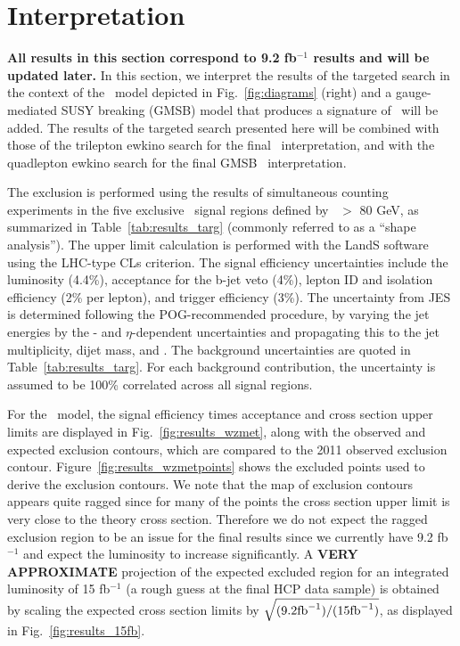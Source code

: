 \section{Interpretation}
\label{sec:interpretation}

{\bf All results in this section correspond to 9.2 fb$^{-1}$ results and will be updated later.}
In this section, we interpret the results of the targeted search in the context of the \wzmet\ model depicted in Fig.~\ref{fig:diagrams} (right)
and a gauge-mediated SUSY breaking (GMSB) model that produces a signature of \zzmet\ will be added. The results of the targeted search presented here
will be combined with those of the trilepton ewkino search for the final \wzmet\ interpretation, and with the quadlepton ewkino search
for the final GMSB \zzmet\ interpretation.

The exclusion is performed using the results of simultaneous counting experiments in the five exclusive \MET\ signal regions defined by \MET\ $>$ 80 GeV,
as summarized in Table~\ref{tab:results_targ} (commonly referred to as a ``shape analysis''). 
The upper limit calculation is performed with the LandS software using the LHC-type CLs criterion.
The signal efficiency uncertainties include the luminosity (4.4\%), acceptance for the b-jet veto (4\%), lepton ID and isolation efficiency (2\% per lepton),
and trigger efficiency (3\%). The uncertainty from JES is determined following the POG-recommended procedure, by varying the jet energies by the 
\pt- and $\eta$-dependent uncertainties and propagating this to the jet multiplicity, dijet mass, and \MET.
The background uncertainties are quoted in Table~\ref{tab:results_targ}. For each background contribution, the uncertainty is assumed to be 100\% 
correlated across all signal regions.

For the \wzmet\ model, the signal efficiency times acceptance and cross section upper limits are displayed in Fig.~\ref{fig:results_wzmet},
along with the observed and expected exclusion contours, which are compared to the 2011 observed exclusion contour.
Figure~\ref{fig:results_wzmetpoints} shows the excluded points used to derive the exclusion contours. We note that the map of exclusion
contours appears quite ragged since for many of the points the cross section upper limit is very close to the theory cross section.
Therefore we do not expect the ragged exclusion region to be an issue for the final results since
we currently have 9.2 fb$^{-1}$ and expect the luminosity to increase significantly. A {\bf VERY APPROXIMATE} projection of the expected excluded region
for an integrated luminosity of 15 fb$^{-1}$ (a rough guess at the final HCP data sample) is obtained by scaling the expected cross section limits by 
$\sqrt{(9.2 \rm{fb}^{-1})/(15 \rm{fb}^{-1})}$, as displayed in Fig.~\ref{fig:results_15fb}.

